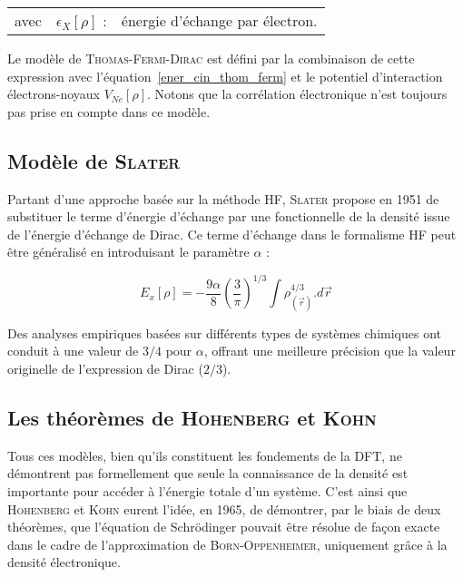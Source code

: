 	\begin{flushleft}
		\begin{tabular}{@{}lrp{10cm}}
			avec & $\epsilon_{X}[\rho]$ : & énergie d'échange par électron. 
		\end{tabular}
	\end{flushleft}
	
	Le modèle de \textsc{Thomas-Fermi-Dirac} est défini par la combinaison de cette expression avec l'équation~\ref{ener_cin_thom_ferm} et le potentiel d'interaction électrons-noyaux $V_{Ne}[\rho]$. Notons que la corrélation électronique n'est toujours pas prise en compte dans ce modèle.
	
	
	\subsection{Modèle de \textsc{Slater}}
	
	Partant d'une approche basée sur la méthode HF, \textsc{Slater} propose en 1951 de substituer le terme d'énergie d'échange par une fonctionnelle de la densité issue de l'énergie d'échange de Dirac. Ce terme d'échange dans le formalisme HF peut être généralisé en introduisant le paramètre $\alpha$ :
	
	\begin{equation}
	E_{x}[\rho] = - \frac{9\alpha}{8} \left(\frac{3}{\pi}\right)^{1/3} \int \rho_{(\vec{r})}^{4/3} .d\vec{r}
	\end{equation}
	
	Des analyses empiriques basées sur différents types de systèmes chimiques ont conduit à une valeur de $3/4$ pour $\alpha$, offrant une meilleure précision que la valeur originelle de l'expression de Dirac ($2/3$).
	
	\subsection{Les théorèmes de \textsc{Hohenberg} et \textsc{Kohn}}
	
	Tous ces modèles, bien qu'ils constituent les fondements de la DFT, ne démontrent pas formellement que seule la connaissance de la densité est importante pour accéder à l'énergie totale d'un système. C'est ainsi que \textsc{Hohenberg} et \textsc{Kohn} eurent l'idée, en 1965, de démontrer, par le biais de deux théorèmes, que l'équation de Schr\"{o}dinger pouvait être résolue de façon exacte dans le cadre de l'approximation de \textsc{Born-Oppenheimer}, uniquement grâce à la densité électronique.
	
